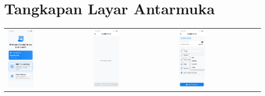\chapter{Tangkapan Layar Antarmuka}
\label{chapter:tangkapan-layar-antarmuka}

\begin{tabular}{lll}
    \includegraphics[width=0.33\textwidth]{images/UI/choose-document.jpg} &
    \includegraphics[width=0.33\textwidth]{images/UI/extracting.jpg} &
    \includegraphics[width=0.33\textwidth]{images/UI/qris-a.jpg}

\end{tabular}
